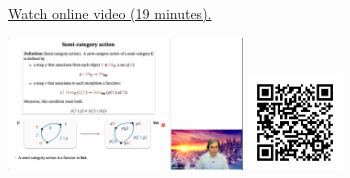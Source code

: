 
\begin{minipage}{10cm}
    \href{https://act4e-spring21.netlify.app/spring2021-functors:semi-and-fun.html}{Watch online video (19 minutes).}
        
    \href{https://act4e-spring21.netlify.app/spring2021-functors:semi-and-fun.html}{\includegraphics[height=3.5cm]{spring2021-functors:semi-and-fun/thumbnails.jpg}}
    \href{https://act4e-spring21.netlify.app/spring2021-functors:semi-and-fun.html}{\includegraphics[height=2.5cm]{spring2021-functors:semi-and-fun/qrcode.png}}
\end{minipage}
